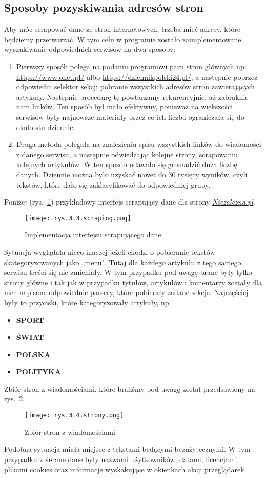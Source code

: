 \subsection{Sposoby pozyskiwania adresów stron}
\label{sec:3.1.2}

Aby móc scrapować dane ze stron internetowych, trzeba mieć adresy, które będziemy przetwarzać. W tym celu w programie zostało zaimplementowane wyszukiwanie odpowiednich serwisów na dwa sposoby:
\begin{enumerate}
\item Pierwszy sposób polega na podaniu programowi paru stron głównych np: \url{https://www.onet.pl/} albo \url{https://dziennikpolski24.pl/}, a następnie poprzez odpowiedni selektor sekcji pobranie wszystkich adresów stron zawierających artykuły. Następnie procedurę tę powtarzamy rekurencyjnie, aż zabraknie nam linków.
Ten sposób był mało efektywny, ponieważ na większości serwisów były najnowsze materiały przez co ich liczba ograniczała się do około stu dziennie.
\item Druga metoda polegała na znalezieniu spisu wszystkich linków do wiadomości z danego serwisu, a następnie odwiedzając kolejne strony, scrapowaniu kolejnych artykułów. W ten sposób udawało się gromadzić duża liczbę danych. Dziennie można było uzyskać nawet do 30 tysięcy wyników, czyli tekstów, które dało się zaklasyfikować do odpowiedniej grupy.
\end{enumerate}
Poniżej (rys.~\ref{fig:3.3}) przykładowy interfejs scrapujący dane dla strony \href{https://niezalezna.pl/}{\emph{Niezależna.pl}}.
\begin{figure}[h]
    \centering
    \texttt{[image: rys.3.3.scraping.png]}
    \caption{Implementacja interfejsu scrapującego dane}
    \label{fig:3.3}
\end{figure}

Sytuacja wyglądała nieco inaczej jeżeli chodzi o pobieranie tekstów skategoryzowanych jako „menu". Tutaj dla każdego artykułu z tego samego serwisu treści się nie zmieniały. W tym przypadku pod uwagę brane były tylko strony główne i tak jak w przypadku tytułów, artykułów i komentarzy zostały dla nich napisane odpowiednie parsery, które pobierały zadane sekcje. Najczęściej były to przyciski, które kategoryzowały artykuły, np:
\begin{itemize}[label=\textbullet]
\item \textbf{SPORT}
\item \textbf{ŚWIAT}
\item \textbf{POLSKA}
\item \textbf{POLITYKA}
\end{itemize}
Zbiór stron z wiadomościami, które braliśmy pod uwagę został przedsawiony na rys.~\ref{fig:3.4}.
\begin{figure}[h]
    \centering
    \texttt{[image: rys.3.4.strony.png]}
    \caption{Zbiór stron z wiadomościami}
    \label{fig:3.4}
\end{figure}
Podobna sytuacja miała miejsce z tekstami będącymi bezużytecznymi. W tym przypadku zbierane dane były nazwami użytkowników, datami, licencjami, plikami cookies oraz informacje wyskakujące w okienkach akcji przeglądarek.



